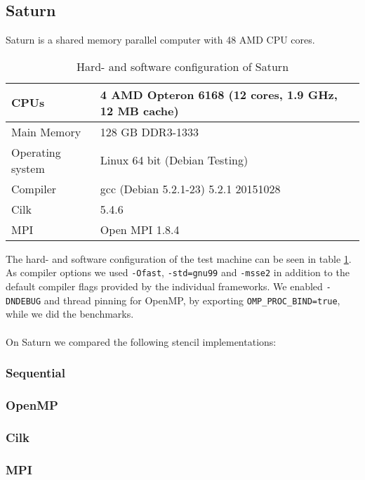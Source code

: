 \documentclass[11pt,a4paper]{article}
\begin{document}
\subsection{Saturn}
Saturn is a shared memory parallel computer with 48 AMD CPU cores.

\begin{table}[!ht]
  \label{tab:saturn} 
  \caption{Hard- and software configuration of Saturn}
  \begin{center}
    \begin{tabular}{|l|l|}
      \hline
      CPUs & 4 AMD Opteron 6168 (12 cores, 1.9 GHz, 12 MB cache)\\\hline
      Main Memory & 128 GB DDR3-1333\\\hline
      Operating system & Linux 64 bit (Debian Testing)\\\hline
      Compiler & gcc (Debian 5.2.1-23) 5.2.1 20151028\\\hline
      Cilk & 5.4.6\\\hline
      MPI & Open MPI 1.8.4\\\hline
    \end{tabular}
  \end{center}
\end{table}

The hard- and software configuration of the test machine can be seen in table \ref{tab:saturn}. As compiler options we used \verb|-Ofast|, \verb|-std=gnu99| and \verb|-msse2| in addition to the default compiler flags provided by the individual frameworks. We enabled \verb|-DNDEBUG| and thread pinning for OpenMP, by exporting \verb|OMP_PROC_BIND=true|, while we did the benchmarks.\\
\\
On Saturn we compared the following stencil implementations:
\subsubsection{Sequential}
\subsubsection{OpenMP}
\subsubsection{Cilk}
\subsubsection{MPI}
\end{document}
